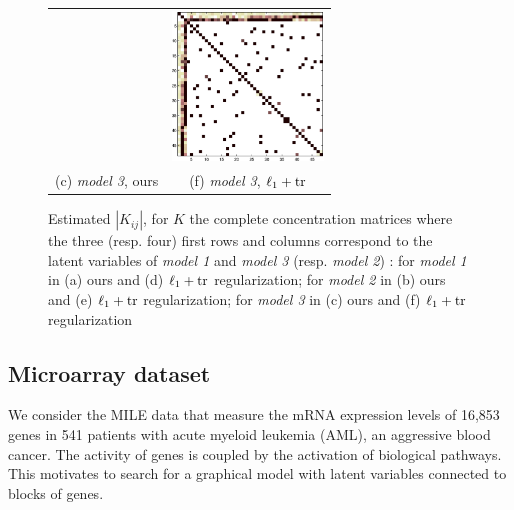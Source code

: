 \begin{figure}
\begin{tabular}{cc}
  &   \includegraphics[width=4cm]{fig/diff_tr}
   \\    (c)  \textit{model 3}, ours & (f)  \textit{model 3}, $\ell_1+{\rm tr}$  \\[6pt]
\end{tabular}
\caption{Estimated $|K_{ij}|$, for $K$ the complete concentration matrices where the three (resp. four) first rows and columns correspond to the latent variables of \textit{model 1} and \textit{model 3} (resp. \textit{model 2}) : for \textit{model 1} in (a) ours and (d) $\ell_1+{\rm tr}$ regularization; for \textit{model 2} in (b) ours and (e) $\ell_1+{\rm tr}$ regularization; for \textit{model 3} in (c) ours and (f) $\ell_1+{\rm tr}$ regularization }
\end{figure}


\subsection{Microarray dataset}

We consider the MILE data \citep{haferlach2010clinical} that measure the mRNA expression levels of 16,853 genes in 541 patients with acute myeloid leukemia (AML), an aggressive blood cancer. The activity of genes is coupled by the activation of biological pathways. This motivates to search for a graphical model with latent variables connected to blocks of genes.

